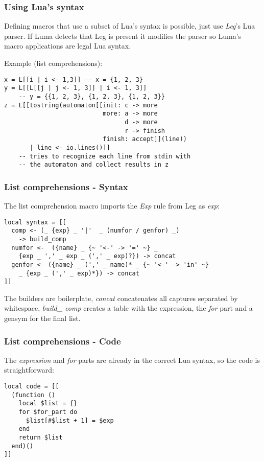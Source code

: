 \documentclass{beamer}
\begin{document}
\begin{frame}[fragile]
\frametitle{Using Lua's syntax}

Defining macros that use a subset of Lua's syntax is possible, just use \emph{Leg}'s Lua parser. If
Luma detects that Leg is present it modifies the parser so Luma's macro applications are legal Lua syntax.

Example (list comprehensions):

\begin{verbatim}
x = L[[i | i <- 1,3]] -- x = {1, 2, 3}
y = L[[L[[j | j <- 1, 3]] | i <- 1, 3]] 
    -- y = {{1, 2, 3}, {1, 2, 3}, {1, 2, 3}}
z = L[[tostring(automaton[[init: c -> more 
                           more: a -> more
                                 d -> more
                                 r -> finish
                           finish: accept]](line))
       | line <- io.lines()]]
    -- tries to recognize each line from stdin with
    -- the automaton and collect results in z
\end{verbatim}

\end{frame}

\begin{frame}[fragile]
\frametitle{List comprehensions - Syntax}
The list comprehension macro imports the \emph{Exp} rule from Leg as \emph{exp}:

\begin{verbatim}
local syntax = [[
  comp <- (_ {exp} _ '|'  _ (numfor / genfor) _)
    -> build_comp
  numfor <-  ({name} _ {~ '<-' -> '=' ~} _ 
    {exp _ ',' _ exp _ (',' _ exp)?}) -> concat
  genfor <- ({name} _ (',' _ name)* _ {~ '<-' -> 'in' ~}
    _ {exp _ (',' _ exp)*}) -> concat
]]
\end{verbatim}

The builders are boilerplate, \emph{concat} concatenates all captures
separated by whitespace, \emph{build\_ comp} creates a table with the expression,
the \emph{for} part and a gensym for the final list.
\end{frame}

\begin{frame}[fragile]
\frametitle{List comprehensions - Code}
The \emph{expression} and \emph{for} parts are already in the correct Lua syntax, so the
code is straightforward:

\begin{verbatim}
local code = [[
  (function ()
    local $list = {}
    for $for_part do
      $list[#$list + 1] = $exp
    end
    return $list
  end)()
]]
\end{verbatim}
\end{frame}
\end{document}
